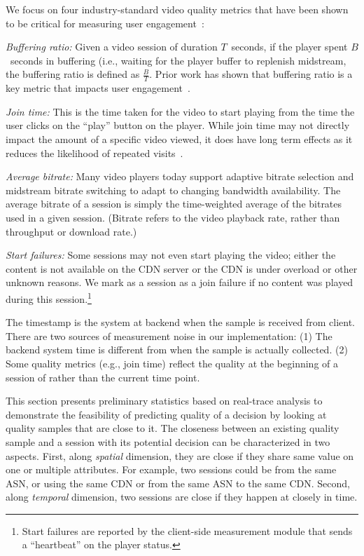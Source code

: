  We focus on four industry-standard video quality metrics that have been shown to be critical for measuring user engagement~\cite{sigcomm11}:
\begin{packedenumerate}
\item \emph{Buffering ratio:}  Given a video session of duration $T$~seconds,
if the player spent $B$~seconds in buffering (i.e., waiting for the player
 buffer to replenish midstream, the buffering ratio is defined as
 $\frac{B}{T}$. Prior work has shown that buffering ratio is a key metric
 that impacts user engagement~\cite{sigcomm11}.
\item \emph{Join time:}  This is the time taken for the video to start playing
 from the time the user clicks on the ``play'' button on the player.
 While join time may not directly impact the amount of a specific video viewed,
 it does have long term effects as it reduces the likelihood of repeated
visits~\cite{sigcomm11,akamai-imc12}.
\item \emph{Average bitrate:} Many video players today support adaptive bitrate
selection and midstream bitrate switching to adapt to changing bandwidth
availability. The average bitrate of a session is simply the time-weighted
average of the bitrates used in a given session. (Bitrate refers to the video playback rate, rather than throughput or download rate.)
\item \emph{Start failures:}   Some sessions may not even start playing the
video; either the content is not available on the CDN server or the CDN is
under overload or other unknown reasons. We mark as a session as a join failure
if no content was played during this session.\footnote{Start failures are
reported by the client-side measurement module that sends a ``heartbeat'' on
the player status.}
\end{packedenumerate}

 The timestamp is the system at backend when the sample is received from client. There are two sources of measurement noise in our implementation: (1) The backend system time is different from when the sample is actually collected. (2) Some quality metrics (e.g., join time) reflect the quality at the beginning of a session of rather than the current time point. 



This section presents preliminary statistics based on real-trace analysis to demonstrate the feasibility of predicting quality of a decision by looking at quality samples that are close to it. The closeness between an existing quality sample and a session with its potential decision can be characterized in two aspects. First, along {\it spatial} dimension, they are close if they share same value on one or multiple attributes. For example, two sessions could be from the same ASN, or using the same CDN or from the same ASN to the same CDN. Second, along {\it temporal} dimension, two sessions are close if they happen at closely in time.

